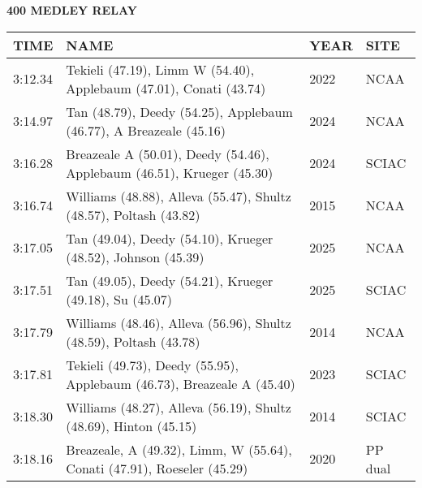\begin{center}
\begin{minipage}[t]{0.7\textwidth}
\centering
\textbf{400 MEDLEY RELAY}\\[0.05cm]
\begin{tabular}{@{}p{1.8cm}p{2.8cm}p{1.2cm}p{1.4cm}@{}}
\hline
\textbf{TIME} & \textbf{NAME} & \textbf{YEAR} & \textbf{SITE} \\
\hline
3:12.34 & Tekieli (47.19), Limm W (54.40), Applebaum (47.01), Conati (43.74) & 2022 & NCAA \\
3:14.97 & Tan (48.79), Deedy (54.25), Applebaum (46.77), A Breazeale (45.16) & 2024 & NCAA \\
3:16.28 & Breazeale A (50.01), Deedy (54.46), Applebaum (46.51), Krueger (45.30) & 2024 & SCIAC \\
3:16.74 & Williams (48.88), Alleva (55.47), Shultz (48.57), Poltash (43.82) & 2015 & NCAA \\
3:17.05 & Tan (49.04), Deedy (54.10), Krueger (48.52), Johnson (45.39) & 2025 & NCAA \\
3:17.51 & Tan (49.05), Deedy (54.21), Krueger (49.18), Su (45.07) & 2025 & SCIAC \\
3:17.79 & Williams (48.46), Alleva (56.96), Shultz (48.59), Poltash (43.78) & 2014 & NCAA \\
3:17.81 & Tekieli (49.73), Deedy (55.95), Applebaum (46.73), Breazeale A (45.40) & 2023 & SCIAC \\
3:18.30 & Williams (48.27), Alleva (56.19), Shultz (48.69), Hinton (45.15) & 2014 & SCIAC \\
3:18.16 & Breazeale, A (49.32), Limm, W (55.64), Conati (47.91), Roeseler (45.29) & 2020 & PP dual \\
\hline
\end{tabular}
\end{minipage}
\end{center}

\vspace{0.4cm}

